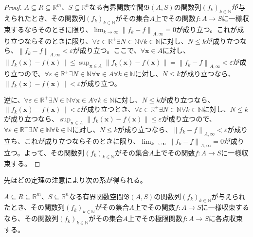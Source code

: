 \documentclass[dvipdfmx]{jsarticle}
\begin{document}
\begin{proof}
$A \subseteq R \subseteq \mathbb{R}^{m}$、$S \subseteq \mathbb{R}^{n}$なる有界関数空間$\mathfrak{B}(A,S)$の関数列$\left( f_{k} \right)_{k \in \mathbb{N}}$が与えられたとき、その関数列$\left( f_{k} \right)_{k \in \mathbb{N}}$がその集合$A$上でその関数$f:A \rightarrow S$に一様収束するならそのときに限り、$\lim_{k \rightarrow \infty}\left\| f_{k} - f \right\|_{A,\infty} = 0$が成り立つ。これが成り立つならそのときに限り、$\forall\varepsilon \in \mathbb{R}^{+}\exists N \in \mathbb{N}\forall k \in \mathbb{N}$に対し、$N \leq k$が成り立つなら、$\left\| f_{k} - f \right\|_{A,\infty} < \varepsilon$が成り立つ。ここで、$\forall\mathbf{x} \in A$に対し、$\left\| f_{k}\left( \mathbf{x} \right) - f\left( \mathbf{x} \right) \right\| \leq \sup_{\mathbf{x} \in A}\left\| f_{k}\left( \mathbf{x} \right) - f\left( \mathbf{x} \right) \right\| = \left\| f_{k} - f \right\|_{A,\infty} < \varepsilon$が成り立つので、$\forall\varepsilon \in \mathbb{R}^{+}\exists N \in \mathbb{N}\forall\mathbf{x} \in A\forall k \in \mathbb{N}$に対し、$N \leq k$が成り立つなら、$\left\| f_{k}\left( \mathbf{x} \right) - f\left( \mathbf{x} \right) \right\| < \varepsilon$が成り立つ。\par
逆に、$\forall\varepsilon \in \mathbb{R}^{+}\exists N \in \mathbb{N}\forall\mathbf{x} \in A\forall k \in \mathbb{N}$に対し、$N \leq k$が成り立つなら、$\left\| f_{k}\left( \mathbf{x} \right) - f\left( \mathbf{x} \right) \right\| < \varepsilon$が成り立つとき、$\forall\varepsilon \in \mathbb{R}^{+}\exists N \in \mathbb{N}\forall k \in \mathbb{N}$に対し、$N \leq k$が成り立つなら、$\sup_{\mathbf{x} \in A}\left\| f_{k}\left( \mathbf{x} \right) - f\left( \mathbf{x} \right) \right\| \leq \varepsilon$が成り立つので、$\forall\varepsilon \in \mathbb{R}^{+}\exists N \in \mathbb{N}\forall k \in \mathbb{N}$に対し、$N \leq k$が成り立つなら、$\left\| f_{k} - f \right\|_{A,\infty} < \varepsilon$が成り立ち、これが成り立つならそのときに限り、$\lim_{k \rightarrow \infty}\left\| f_{k} - f \right\|_{A,\infty} = 0$が成り立つ。よって、その関数列$\left( f_{k} \right)_{k \in \mathbb{N}}$がその集合$A$上でその関数$f:A \rightarrow S$に一様収束する。
\end{proof}\par
先ほどの定理の注意により次の系が得られる。
\begin{thm}\label{4.1.11.7}
$A \subseteq R \subseteq \mathbb{R}^{m}$、$S \subseteq \mathbb{R}^{n}$なる有界関数空間$\mathfrak{B}(A,S)$の関数列$\left( f_{k} \right)_{k \in \mathbb{N}}$が与えられたとき、その関数列$\left( f_{k} \right)_{k \in \mathbb{N}}$がその集合$A$上でその関数$f:A \rightarrow S$に一様収束するなら、その関数列$\left( f_{k} \right)_{k \in \mathbb{N}}$がその集合$A$上でその極限関数$f:A \rightarrow S$に各点収束する。
\end{thm}\par
\end{document}

